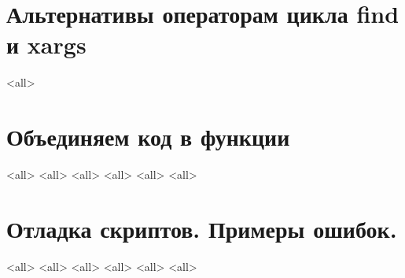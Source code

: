 \section{ Альтернативы операторам цикла find и xargs }
\mode<all>{}
\section{ Объединяем код в функции }
\mode<all>{}
\mode<all>{}
\mode<all>{}
\mode<all>{}
\mode<all>{}
\mode<all>{}

\section{ Отладка скриптов. Примеры ошибок. }
\mode<all>{}
\mode<all>{}
\mode<all>{}
\mode<all>{}
\mode<all>{}
\mode<all>{}




\bye
